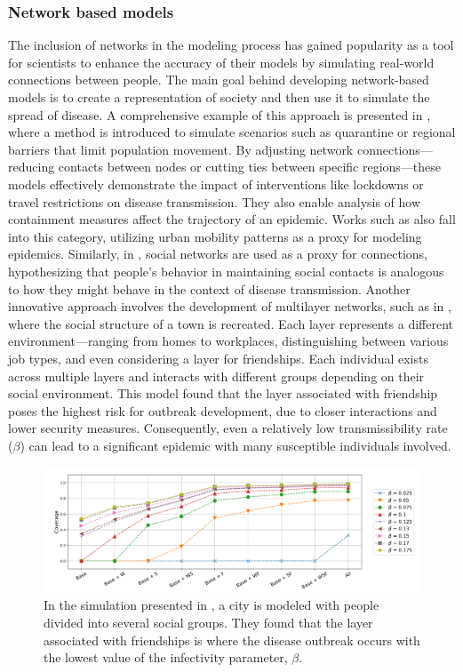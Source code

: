 \subsubsection{Network based models}
The inclusion of networks in the modeling process has gained popularity as a tool for scientists to enhance the accuracy of their models by simulating real-world connections between people. The main goal behind developing network-based models is to create a representation of society and then use it to simulate the spread of disease. A comprehensive example of this approach is presented in \cite{VanMieghem2009}, where a method is introduced to simulate scenarios such as quarantine or regional barriers that limit population movement. By adjusting network connections—reducing contacts between nodes or cutting ties between specific regions—these models effectively demonstrate the impact of interventions like lockdowns or travel restrictions on disease transmission. They also enable analysis of how containment measures affect the trajectory of an epidemic.
Works such as \cite{Tizzoni2014} also fall into this category, utilizing urban mobility patterns as a proxy for modeling epidemics. Similarly, in \cite{Carballosa_2021}, social networks are used as a proxy for connections, hypothesizing that people's behavior in maintaining social contacts is analogous to how they might behave in the context of disease transmission.
Another innovative approach involves the development of multilayer networks, such as in \cite{Turker_2023}, where the social structure of a town is recreated. Each layer represents a different environment—ranging from homes to workplaces, distinguishing between various job types, and even considering a layer for friendships. Each individual exists across multiple layers and interacts with different groups depending on their social environment. This model found that the layer associated with friendship poses the highest risk for outbreak development, due to closer interactions and lower security measures. Consequently, even a relatively low transmissibility rate ($\beta$) can lead to a significant epidemic with many susceptible individuals involved.
\begin{figure}[h]
	\centering
	\includegraphics[width=0.9\linewidth]{0_introduction/images_review/turker_city_recreated}
	\caption[Simulation of a city]{In the simulation presented in \cite{Turker_2023}, a city is modeled with people divided into several social groups. They found that the layer associated with friendships is where the disease outbreak occurs with the lowest value of the infectivity parameter, $\beta$.}
	\label{fig:turkercityrecreated}
\end{figure}



